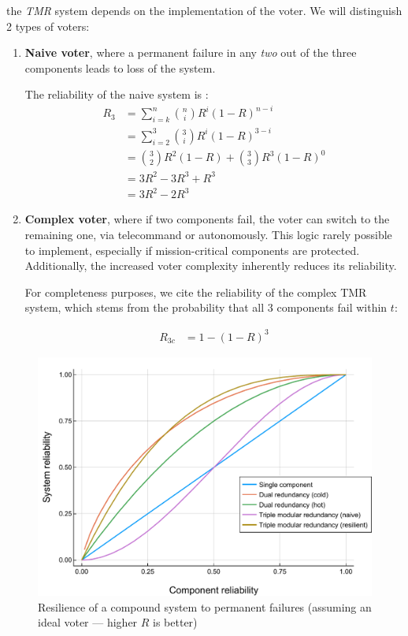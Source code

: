 \documentclass[a4paper,nobib]{tufte-book}
\begin{document}
 
 the \emph{\ac{TMR}} system depends on the implementation of the voter. We will distinguish 2 types of voters:
\begin{enumerate}
	\item \textbf{Naive voter}, where a permanent failure in any \emph{two} out of the three components leads to loss of the system.
	
	The reliability of the naive system is \autocite[31]{birolini_reliability_engineering_2004}:
	\begin{align}
	R_3 &= \sum_{i=k}^{n} \binom{n}{i} R^i (1-R)^{n-i}\nonumber\\
	&= \sum_{i=2}^{3} \binom{3}{i} R^i (1-R)^{3-i} \nonumber\\
	&= \binom{3}{2} R^2 (1-R) + \binom{3}{3} R^3 (1-R)^0 \nonumber\\
	&= 3R^2 - 3R^3 + R^3 \nonumber\\
	&= 3R^2 - 2R^3
	\label{eq:tmr}
	\end{align}
	
	\item \textbf{Complex voter}, where if two components fail, the voter can switch to the remaining one, via telecommand or autonomously. This logic rarely possible to implement, especially if mission-critical components are protected. Additionally, the increased voter complexity inherently reduces its reliability.
	
	For completeness purposes, we cite the reliability of the complex \acs{TMR} system, which stems from the probability that all 3 components fail within \( t \):

	\begin{align}
	R_{3c} &= 1 - (1 - R)^3
	\label{eq:tmr_complex}
	\end{align}
\end{enumerate}


\begin{figure}
	\centering
	\includegraphics{analysis/reliability_norepair_en}
	\caption[Resilience of a compound system to permanent failures (assuming an ideal voter)]{Resilience of a compound system to permanent failures (assuming an ideal voter --- higher \(R\) is better)}
	\label{fig:reliability_norepair}
\end{figure}
\end{document}
